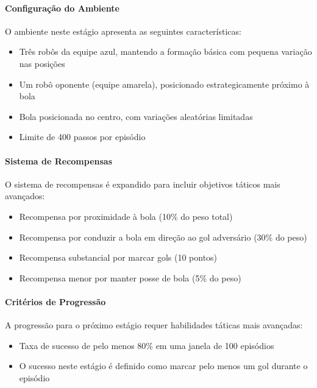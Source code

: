 \paragraph{Configuração do Ambiente}

O ambiente neste estágio apresenta as seguintes características:
\begin{itemize}
    \item Três robôs da equipe azul, mantendo a formação básica com pequena variação nas posições
    \item Um robô oponente (equipe amarela), posicionado estrategicamente próximo à bola
    \item Bola posicionada no centro, com variações aleatórias limitadas
    \item Limite de 400 passos por episódio
\end{itemize}

\paragraph{Sistema de Recompensas}

O sistema de recompensas é expandido para incluir objetivos táticos mais avançados:
\begin{itemize}
    \item Recompensa por proximidade à bola (10\% do peso total)
    \item Recompensa por conduzir a bola em direção ao gol adversário (30\% do peso)
    \item Recompensa substancial por marcar gols (10 pontos)
    \item Recompensa menor por manter posse de bola (5\% do peso)
\end{itemize}

\paragraph{Critérios de Progressão}

A progressão para o próximo estágio requer habilidades táticas mais avançadas:
\begin{itemize}
    \item Taxa de sucesso de pelo menos 80\% em uma janela de 100 episódios
    \item O sucesso neste estágio é definido como marcar pelo menos um gol durante o episódio
\end{itemize}


